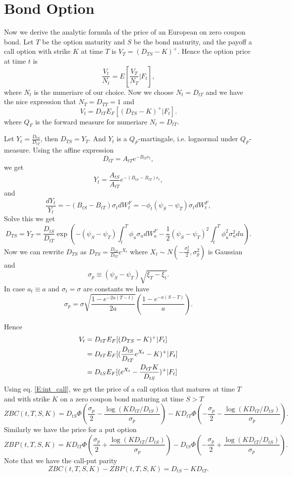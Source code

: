 \section{Bond Option}
Now we derive the analytic formula of the price of an European on zero coupon
bond. Let $T$ be the option maturity and $S$ be the bond maturity, and the
payoff a call option with strike $K$ at time $T$ is $V_T=(D_{TS}-K)^+$. Hence
the option price at time $t$ is
\[
  \frac{V_t}{N_t} = E[\frac{V_T}{N_T}|F_t],
\]
where $N_t$ is the numeriare of our choice. Now we choose $N_t=D_{tT}$ and we
have the nice expression that $N_T=D_{TT}=1$ and
\[
  V_t= D_{tT} E_F[(D_{TS}-K)^+|F_t].
\]
where $Q_F$ is the forward measure for numeriare $N_t=D_{tT}$.

Let $Y_t=\frac{D_{tS}}{D_{tT}}$, then $D_{TS}=Y_T$. And $Y_t$ is a 
$Q_F$-martingale, i.e. lognormal under $Q_F$-measure. Using the affine 
expression
\[
  D_{tT} = A_{tT} e^{-B_{tT} r_t},
\]
we get
\[
  Y_t = \frac{A_{tS}}{A_{tT}} e^{-(B_{tS}-B_{tT}) r_t},
\]
and 
\[
  \frac{dY_t}{Y_t} = - (B_{tS}-B_{tT}) \sigma_t dW_t^F
    = - \phi_t (\psi_S-\psi_T) \sigma_t dW_t^F,
\]
Solve this we get
\[
  D_{TS} = Y_T = \frac{D_{tS}}{D_{tT}}
    \exp 
      \left(    
        -(\psi_S-\psi_T) \int_t^T \phi_u \sigma_u dW_u^F
        -\frac{1}{2}(\psi_S-\psi_T)^2 \int_t^T \phi_u^2 \sigma_u^2 du
      \right).
\]
Now we can rewrite $D_{TS}$ as $D_{TS}=\frac{D_{tS}}{D_{tT}} e^{X_t}$ where 
$X_t\sim N(-\frac{\sigma_p^2}{2}, \sigma_p^2)$ is Gaussian and 
\begin{equation} \label{E:sigma_p}
  \sigma_p \equiv (\psi_S-\psi_T) \sqrt{\xi_T-\xi_t}.
\end{equation}
In case $a_t\equiv a$ and $\sigma_t=\sigma$ are constants we have
\[
  \sigma_p = \sigma \sqrt{ \frac{1-e^{-2a(T-t)}}{2a} }
            \left( \frac{ 1-e^{-a(S-T)} }{a}  \right).
\]

Hence
\begin{align*}
  V_t&= D_{tT} E_F[(D_{TS}-K)^+|F_t] \notag \\
     &= D_{tT} E_F[(\frac{D_{tS}}{D_{tT}}e^{X_t} -K)^+|F_t] \notag \\
     &= D_{tS} E_F[(e^{X_t} -\frac{D_{tT}K}{D_{tS}})^+|F_t] \notag \\
\end{align*}
Using eq. \ref{E:int_call}, we get the price of a call option that matures at 
time $T$ and with strike $K$ on a zero coupon bond maturing at time $S>T$  
\begin{equation} \label{E:zbc}
  ZBC(t,T,S,K) = 
    D_{tS}\Phi
      \left( \frac{\sigma_p}{2}-\frac{\log(KD_{tT}/D_{tS})}{\sigma_p} \right)
    - K D_{tT} \Phi
      \left(-\frac{\sigma_p}{2}-\frac{\log(KD_{tT}/D_{tS})}{\sigma_p} \right).
\end{equation}
Similarly we have the price for a put option
\begin{equation} \label{E:zbp}
  ZBP(t,T,S,K) = 
    K D_{tT} \Phi
      \left(\frac{\sigma_p}{2}+\frac{\log(KD_{tT}/D_{tS})}{\sigma_p} \right)
    - D_{tS}\Phi
      \left( -\frac{\sigma_p}{2}+\frac{\log(KD_{tT}/D_{tS})}{\sigma_p} \right).
\end{equation}
Note that we have the call-put parity
\[
  ZBC(t,T,S,K)-ZBP(t,T,S,K) = D_{tS}-KD_{tT}.
\]

